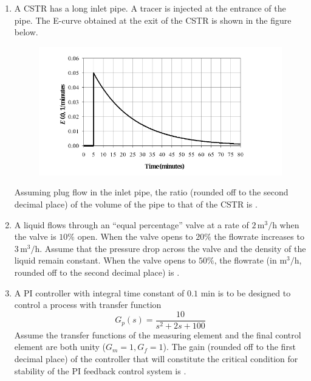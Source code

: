 \documentclass[journal,12pt,onecolumn]{IEEEtran}
\theoremstyle{remark}
\begin{document}
\begin{enumerate}
\item A CSTR has a long inlet pipe. A tracer is injected at the entrance of the pipe. The E-curve obtained at the exit of the CSTR is shown in the figure below.
\begin{figure}[H]
    \centering
    \includegraphics[width=0.5\columnwidth]{figs/qn 50.jpg}
    \caption{}
    \label{fig:qn 60.jpg}
\end{figure}
Assuming plug flow in the inlet pipe, the ratio (rounded off to the second decimal place) of the volume of the pipe to that of the CSTR is \underline{\hspace{1cm}}.
\hfill{}

\item A liquid flows through an ``equal percentage'' valve at a rate of $2 \, \text{m}^3/\text{h}$ when the valve is $10\%$ open. When the valve opens to $20\%$ the flowrate increases to $3 \, \text{m}^3/\text{h}$. Assume that the pressure drop across the valve and the density of the liquid remain constant. When the valve opens to $50\%$, the flowrate (in $\text{m}^3/\text{h}$, rounded off to the second decimal place) is \underline{\hspace{1cm}}.
\hfill{}

\item A PI controller with integral time constant of $0.1$ min is to be designed to control a process with transfer function
\[G_p(s) = \frac{10}{s^2 + 2s + 100}\]
Assume the transfer functions of the measuring element and the final control element are both unity ($G_m = 1, G_f = 1$). The gain (rounded off to the first decimal place) of the controller that will constitute the critical condition for stability of the PI feedback control system is \underline{\hspace{1cm}}.
\hfill{}


\end{enumerate}
\end{document}
